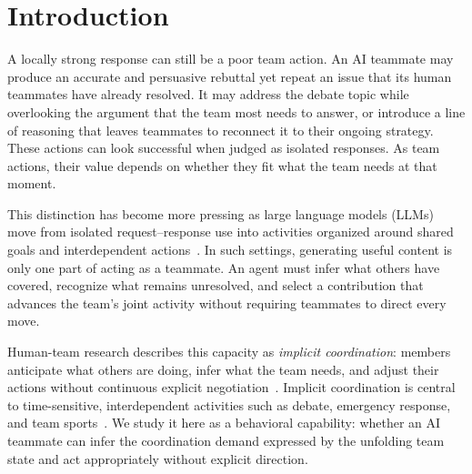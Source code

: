 \documentclass[manuscript,review,anonymous]{acmart}
\begin{document}
\section{Introduction}

A locally strong response can still be a poor team action. An AI teammate may produce an accurate and persuasive rebuttal yet repeat an issue that its human teammates have already resolved. It may address the debate topic while overlooking the argument that the team most needs to answer, or introduce a line of reasoning that leaves teammates to reconnect it to their ongoing strategy. These actions can look successful when judged as isolated responses. As team actions, their value depends on whether they fit what the team needs at that moment.

This distinction has become more pressing as large language models (LLMs) move from isolated request--response use into activities organized around shared goals and interdependent actions~\cite{oneill2020hat, berretta2023defining}. In such settings, generating useful content is only one part of acting as a teammate. An agent must infer what others have covered, recognize what remains unresolved, and select a contribution that advances the team's joint activity without requiring teammates to direct every move.

Human-team research describes this capacity as \emph{implicit coordination}: members anticipate what others are doing, infer what the team needs, and adjust their actions without continuous explicit negotiation~\cite{marks2001temporally, rico2008implicit}. Implicit coordination is central to time-sensitive, interdependent activities such as debate, emergency response, and team sports~\cite{cooke2013interactive, butchibabu2016implicit, ching2020extemporaneous}. We study it here as a behavioral capability: whether an AI teammate can infer the coordination demand expressed by the unfolding team state and act appropriately without explicit direction.
\end{document}
